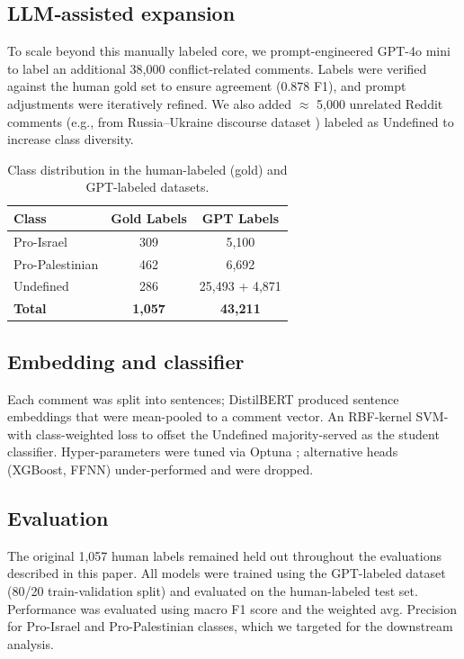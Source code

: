 \documentclass[letterpaper]{article} %
\begin{document}
\subsection{LLM‐assisted expansion}
To scale beyond this manually labeled core, we prompt-engineered GPT-4o mini to label an additional 38,000 conflict-related comments. Labels were verified against the human gold set to ensure agreement (0.878 F1), and prompt adjustments were iteratively refined. We also added $\approx$ 5,000 unrelated Reddit comments (e.g., from Russia--Ukraine discourse dataset \cite{ukraine_russia_reddit_data}) labeled as Undefined to increase class diversity.

\begin{table}[H]
\centering
\caption{Class distribution in the human-labeled (gold) and GPT-labeled datasets.}
\begin{tabular}{lcc}
\toprule
\textbf{Class} & \textbf{Gold Labels} & \textbf{GPT Labels} \\
\midrule
Pro-Israel      & 309   & 5,100  \\
Pro-Palestinian & 462   & 6,692  \\
Undefined       & 286   & 25,493 + 4,871 \\
\textbf{Total}  & \textbf{1,057} & \textbf{43,211} \\
\bottomrule
\end{tabular}
\label{tab:samples_per_class}
\end{table}

\subsection{Embedding and classifier}
Each comment was split into sentences; DistilBERT produced sentence embeddings that were mean-pooled to a comment vector. An RBF-kernel SVM-with class-weighted loss to offset the Undefined majority-served as the student classifier. Hyper-parameters were tuned via Optuna \cite{akiba2019optuna}; alternative heads (XGBoost, FFNN) under-performed and were dropped.

\subsection{Evaluation}
The original 1,057 human labels remained held out throughout the evaluations described in this paper. All models were trained using the GPT-labeled dataset (80/20 train-validation split) and evaluated on the human-labeled test set. Performance was evaluated using macro F1 score and the weighted avg. Precision for Pro-Israel and Pro-Palestinian classes, which we targeted for the downstream analysis.
\end{document}
